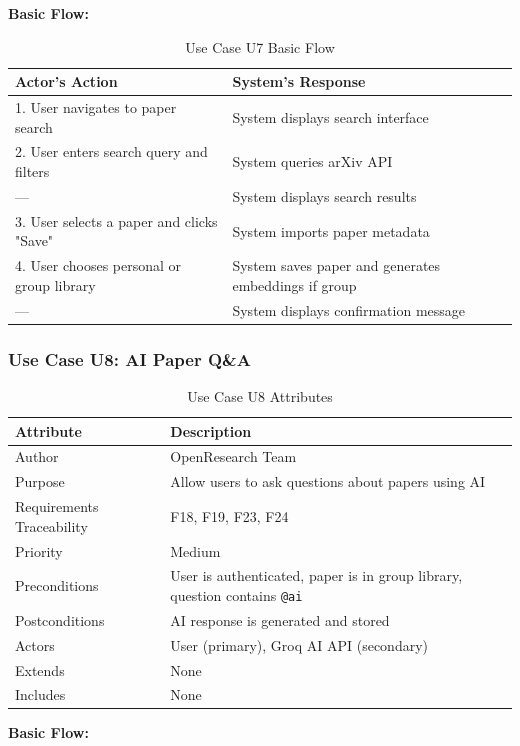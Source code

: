 \documentclass[11pt,a4paper]{article}
\begin{document}
\textbf{Basic Flow:}

\begin{table}[H]
\centering
\begin{tabular}{p{6cm}p{7cm}}
\toprule
\textbf{Actor's Action} & \textbf{System's Response} \\
\midrule
1. User navigates to paper search & System displays search interface \\
2. User enters search query and filters & System queries arXiv API \\
--- & System displays search results \\
3. User selects a paper and clicks "Save" & System imports paper metadata \\
4. User chooses personal or group library & System saves paper and generates embeddings if group \\
--- & System displays confirmation message \\
\bottomrule
\end{tabular}
\caption{Use Case U7 Basic Flow}
\end{table}

\subsubsection{Use Case U8: AI Paper Q\&A}

\begin{table}[H]
\centering
\begin{tabular}{p{4cm}p{9cm}}
\toprule
\textbf{Attribute} & \textbf{Description} \\
\midrule
Author & OpenResearch Team \\
Purpose & Allow users to ask questions about papers using AI \\
Requirements Traceability & F18, F19, F23, F24 \\
Priority & Medium \\
Preconditions & User is authenticated, paper is in group library, question contains \texttt{@ai} \\
Postconditions & AI response is generated and stored \\
Actors & User (primary), Groq AI API (secondary) \\
Extends & None \\
Includes & None \\
\bottomrule
\end{tabular}
\caption{Use Case U8 Attributes}
\end{table}

\textbf{Basic Flow:}
\end{document}
